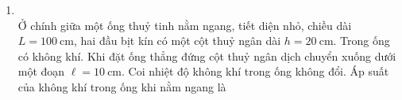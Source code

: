 \begin{enumerate}[label=\bfseries Câu \arabic*:, leftmargin=1.7cm]
\item {}\\
Ở chính giữa một ống thuỷ tinh nằm ngang, tiết diện nhỏ, chiều dài $L=\SI{100}{\centi\meter}$, hai đầu bịt kín có một cột thuỷ ngân dài $h=\SI{20}{\centi\meter}$. Trong ống có không khí. Khi đặt ống thẳng đứng cột thuỷ ngân dịch chuyển xuống dưới một đoạn $\ell=\SI{10}{\centi\meter}$. Coi nhiệt độ không khí trong ống không đổi. Áp suất của không khí trong ống khi nằm ngang là


\end{enumerate}
